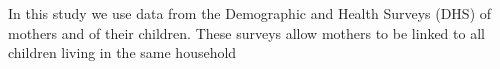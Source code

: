 In this study we use data from the Demographic and Health Surveys (DHS) of 
mothers and of their children.  These surveys allow mothers to be linked to all
children living in the same household

